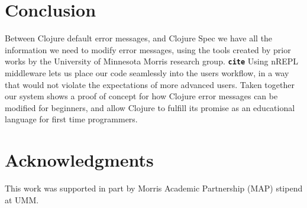 \documentclass[12pt]{article}
\newcommand{\comment}[1]{{\bf \tt  {#1}}}
\begin{document}
\section{Conclusion}
Between Clojure default error messages, and Clojure Spec
we have all the information we need to modify error messages, using the
tools created by prior works by the University of Minnesota Morris research group. \comment{cite}
Using nREPL middleware lets us place our code seamlessly into the users
workflow, in a way that would not violate the expectations of more advanced users.
 Taken together our system shows a proof of concept for how Clojure
error messages can be modified for beginners, and allow Clojure to fulfill
its promise as an educational language for first time programmers.

\section{Acknowledgments}
This work was supported in part by Morris Academic Partnership (MAP) stipend at UMM.




\end{document}
